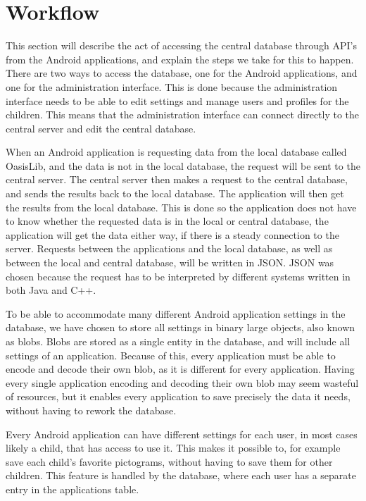 \section{Workflow}
This section will describe the act of accessing the central database through API's from the Android applications, and explain the steps we take for this to happen. There are two ways to access the database, one for the Android applications, and one for the administration interface. This is done because the administration interface needs to be able to edit settings and manage users and profiles for the children. This means that the administration interface can connect directly to the central server and edit the central database.

When an Android application is requesting data from the local database called OasisLib, and the data is not in the local database, the request will be sent to the central server. The central server then makes a request to the central database, and sends the results back to the local database. The application will then get the results from the local database. This is done so the application does not have to know whether the requested data is in the local or central database, the application will get the data either way, if there is a steady connection to the server. Requests between the applications and the local database, as well as between the local and central database, will be written in JSON. JSON was chosen because the request has to be interpreted by different systems written in both Java and C++.

To be able to accommodate many different Android application settings in the database, we have chosen to store all settings in binary large objects, also known as blobs. Blobs are stored as a single entity in the database, and will include all settings of an application. Because of this, every application must be able to encode and decode their own blob, as it is different for every application. Having every single application encoding and decoding their own blob may seem wasteful of resources, but it enables every application to save precisely the data it needs, without having to rework the database.

Every Android application can have different settings for each user, in most cases likely a child, that has access to use it. This makes it possible to, for example save each child's favorite pictograms, without having to save them for other children. This feature is handled by the database, where each user has a separate entry in the applications table.